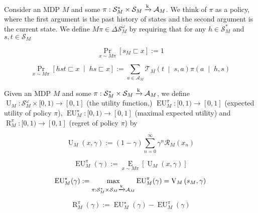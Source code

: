 \documentclass[anon,12pt]{colt2018} %
\newcommand{\Comment}[1]{}
\newcommand{\AP}[1]{\left(#1\right)}
\newcommand{\AB}[1]{\left[#1\right]}
\newcommand{\APM}[2]{\left(#1\;\middle\vert\;#2\right)}
\newcommand{\ABM}[2]{\left[#1\;\middle\vert\;#2\right]}
\newcommand{\Pa}[2]{\underset{#1}{\operatorname{Pr}}\AB{#2}}
\newcommand{\CP}[3]{\underset{#1}{\operatorname{Pr}}\ABM{#2}{#3}}
\newcommand{\Ea}[2]{\underset{#1}{\operatorname{E}}\AB{#2}}
\newcommand{\K}{\xrightarrow{\textnormal{k}}}
\newcommand{\A}{\mathcal{A}}
\newcommand{\St}{\mathcal{S}}
\newcommand{\T}{\mathcal{T}}
\newcommand{\R}{\mathcal{R}}
\newcommand{\Ut}{\operatorname{U}}
\newcommand{\V}{\operatorname{V}}
\newcommand{\EU}{\operatorname{EU}}
\newcommand{\Rg}{\operatorname{R}}
\newcommand{\MP}[2]{#1#2}
\begin{document}
\begin{samepage}
\begin{definition}

Consider an MDP $M$ and some $\pi: \St_M^* \times \St_M \K \A_M$. We think of $\pi$ as a policy, where the first argument is the past history of states and the second argument is the current state. We define $\MP{M}{\pi} \in \Delta\St_M^\omega$ by requiring that for any $h \in \St_M^*$ and $s,t \in \St_M$

\begin{equation}
\Pa{x\sim\MP{M}{\pi}}{s_M \sqsubset x} := 1
\end{equation}


\begin{equation}
\CP{x\sim\MP{M}{\pi}}{hst \sqsubset x}{hs \sqsubset x} := \sum_{a \in \A_M} {\T_M\APM{t}{s,a} \pi\APM{a}{h,s}}
\end{equation}

\Comment{In other words, $\MP{M}{\pi}$ is the probability measure over histories resulting from policy $\pi$ interacting with environment $M$.}

\end{definition}
\end{samepage}

\begin{samepage}
\begin{definition}
\label{def:utility}

Given an MDP $M$ and some $\pi: \St_M^* \times \St_M \K \A_M$, we define $\Ut_M: \St_M^\omega \times [0,1) \rightarrow [0,1]$ (the utility function,) $\EU_M^\pi: [0,1) \rightarrow [0,1]$ (expected utility of policy $\pi$), $\EU_M^\star: [0,1) \rightarrow [0,1]$ (maximal expected utility) and $\Rg_M^\pi:[0,1)\rightarrow[0,1]$ (regret of policy $\pi$) by

\begin{equation}
\Ut_M(x,\gamma) := (1-\gamma)\sum_{n=0}^\infty {\gamma^n \R_M\AP{x_n}}
\end{equation}

\begin{equation}
\EU_M^\pi(\gamma) := \Ea{x\sim\MP{M}{\pi}}{\Ut_M(x,\gamma)}
\end{equation}

\begin{equation}
\EU_M^\star(\gamma):=\max_{\pi: \St_M^* \times \St_M \K \A_M} {\EU_M^\pi(\gamma)} = \V_M\AP{s_M,\gamma}
\end{equation}

\begin{equation}
\Rg_M^\pi(\gamma):=\EU_M^\star(\gamma)-\EU_M^\pi(\gamma)
\end{equation}

\end{definition}
\end{samepage}
\end{document}
